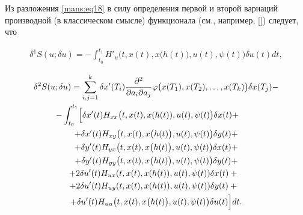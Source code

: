 Из разложения  \eqref{mans:eq18} в силу определения первой и второй вариаций производной (в классическом смысле) функционала (см., например, []) следует, что

\begin{gather*}

\delta^{1} S(u;  \delta u)=- \int_{t_{0}}^{t_{1}} H'_{u} \bigl(t, x(t), x\bigl(h(t)\bigr), u(t), \psi (t)\bigr) \delta u(t) dt , 

\end{gather*}

\begin{multline*}

\delta^{2} S(u; \delta u)= \sum_{i,j=1}^{k} \delta x'(T_{i})  

\dfrac{\partial^{2} } {\partial a_{i} \partial a_{j}} 

\varphi \bigl(x(T_{1}), x(T_{2}), \ldots, x(T_{k})\bigr) \delta x(T_{j}) -   \\

-\int_{t_{0}}^{t_{1}} 

\Bigl[ \delta x'(t) H_{xx}\bigl(t, x(t), x(h(t)), u(t), \psi (t)\bigr) \delta x(t) + \hspace{.75cm}

\\

+ \delta x'(t) H_{xy}\bigl(t, x(t), x\bigl(h(t)\bigr), u(t), \psi (t)\bigr) \delta y(t) + \\

+\delta y'(t) H_{yx}\bigl(t, x(t), x\bigl(h(t)\bigr), u(t), \psi (t)\bigr) \delta x(t)+ \\ 

+ \delta y'(t) H_{yy}\bigl(t, x(t), x\bigl(h(t)\bigr), u(t), \psi (t)\bigr) \delta y(t)+  \\

+2 \delta u'(t) H_{ux}(t, x(t), x(h(t)), u(t), \psi (t)) \delta x(t)+ \phantom{2}\\

+ 2 \delta u'(t) H_{uy}(t, x(t), x(h(t)), u(t), \psi (t)) \delta y(t)+ \phantom{2}  \\

+\delta u'(t) H_{uu} \bigl(t, x(t), x\bigl(h(t)\bigr), u(t), \psi (t)\bigr) \delta u(t) \Bigr]dt . 

\end{multline*}








